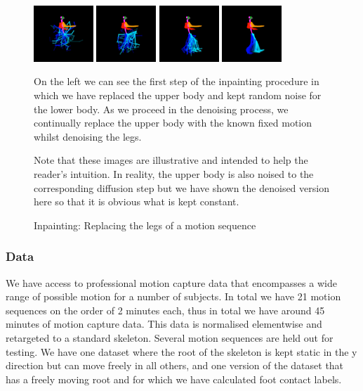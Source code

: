 \begin{figure}[!ht]
    \centering
    \includegraphics[width=0.2\textwidth]{Figures/diffusion/inpainting/1.png}
    \includegraphics[width=0.2\textwidth]{Figures/diffusion/inpainting/2.png}
    \includegraphics[width=0.2\textwidth]{Figures/diffusion/inpainting/3.png}
    \includegraphics[width=0.2\textwidth]{Figures/diffusion/inpainting/4.png}
    \caption{Inpainting: Replacing the legs of a motion sequence}
    \label{fig:inpainting_video}
    \medskip
    \small
    \raggedright
    On the left we can see the first step of the inpainting procedure in which we have replaced the upper body and kept random noise for the lower body. As we proceed in the denoising process, we continually replace the upper body with the known fixed motion whilst denoising the legs.

    Note that these images are illustrative and intended to help the reader's intuition. In reality, the upper body is also noised to the corresponding diffusion step but we have shown the denoised version here so that it is obvious what is kept constant.
\end{figure}


\subsubsection{Data}
We have access to professional motion capture data that encompasses a wide range of possible motion for a number of subjects. In total we have 21 motion sequences on the order of 2 minutes each, thus in total we have around 45 minutes of motion capture data. This data is normalised elementwise and retargeted to a standard skeleton. Several motion sequences are held out for testing.
We have one dataset where the root of the skeleton is kept static in the y direction but can move freely in all others, and one version of the dataset that has a freely moving root and for which we have calculated foot contact labels.